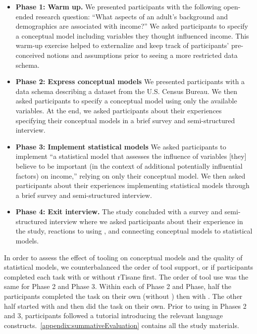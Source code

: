 \begin{itemize}
    \item \textbf{Phase 1: Warm up.} We presented participants with the
    following open-ended research question: ``What aspects of an adult's
    background and demographics are associated with income?'' We asked
    participants to specify a conceptual model including variables they thought
    influenced income. This warm-up exercise helped to externalize and keep
    track of participants' pre-conceived notions and assumptions prior to seeing
    a more restricted data schema.
    \item \textbf{Phase 2: Express conceptual models} We presented participants
    with a data schema describing a dataset from the U.S. Census Bureau. We then
    asked participants to specify a conceptual model using only the available
    variables. At the end, we asked participants about their
    experiences specifying their conceptual models in a brief survey and semi-structured interview.
    \item \textbf{Phase 3: Implement statistical models} We asked participants
    to implement ``a statistical model that assesses the influence of variables
    [they] believe to be important (in the context of additional potentially
    influential factors) on income,'' relying on only their conceptual model. We
    then asked participants about their experiences implementing statistical
    models through a brief survey and semi-structured interview. 
    \item \textbf{Phase 4: Exit interview.} The study concluded with a survey
    and semi-structured interview where we asked participants about their
    experience in the study, reactions to using \rTisane, and connecting
    conceptual models to statistical models.
\end{itemize} 

In order to assess the effect of tooling on conceptual models and the quality of
statistical models, we counterbalanced the order of tool support, or if
participants completed each task with or without rTisane first. The order of
tool use was the same for Phase 2 and Phase 3. Within each of Phase 2 and Phase,
half the participants completed the task on their own (without \rTisane) then
with \rTisane. The other half started with \rTisane and then did the task on
their own. Prior to using \rTisane in Phases 2 and 3, participants followed a
tutorial introducing the relevant language
constructs.~\autoref{appendix:summativeEvaluation} contains all the study
materials.

